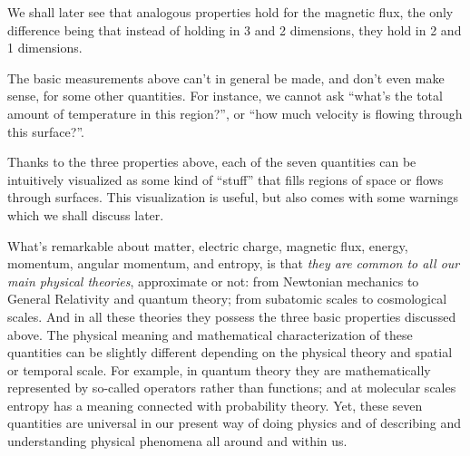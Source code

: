 \documentclass[a4paper,12pt,%
onecolumn,oneside,%
british%
]{memoir}
\renewcommand*{\|}[1][]{\nonscript\:#1\vert\nonscript\:\mathopen{}}
\begin{document}
We shall later see that analogous properties hold for the magnetic flux, the only difference being that instead of holding in 3 and 2 dimensions, they hold in 2 and 1 dimensions.

\smallskip

The basic measurements above can't in general be made, and don't even make sense, for some other quantities. For instance, we cannot ask \enquote{what's the total amount of temperature in this region?}, or \enquote{how much velocity is flowing through this surface?}.

\smallskip

Thanks to the three properties above, each of the seven quantities can be intuitively visualized as some kind of \enquote{stuff} that fills regions of space or flows through surfaces. This visualization is useful, but also comes with some warnings which we shall discuss later.


\medskip

What's remarkable about matter, electric charge, magnetic flux, energy, momentum, angular momentum, and entropy, is that \emph{they are common to all our main physical theories}, approximate or not: from Newtonian mechanics to General Relativity and quantum theory; from subatomic scales to cosmological scales. And in all these theories they possess the three basic properties discussed above. The physical meaning and mathematical characterization of these quantities can be slightly different depending on the physical theory and spatial or temporal scale. For example, in quantum theory they are mathematically represented by so-called operators rather than functions; and at molecular scales entropy has a meaning connected with probability theory. Yet, these seven quantities are universal in our present way of doing physics and of describing and understanding physical phenomena all around and within us.
\end{document}
